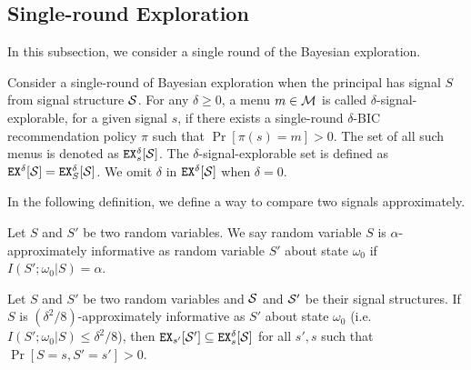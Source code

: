 \subsection{Single-round Exploration}
\label{sec:private_single}

In this subsection, we consider a single round of the Bayesian exploration.

\begin{definition}
Consider a single-round of Bayesian exploration when the principal has signal $S$ from signal structure $\S$. For any $\delta \geq 0$, a menu $m \in \M$ is called $\delta$-signal-explorable, for a given signal $s$, if there exists a single-round $\delta$-BIC recommendation policy $\pi$ such that $\Pr[\pi(s) = m] > 0$. The set of all such menus is denoted as $\EX^{\delta}_s[\S]$. The $\delta$-signal-explorable set is defined as $\EX^{\delta}[\S] = \EX^{\delta}_S[\S]$. We omit $\delta$ in $\EX^{\delta}[\S]$ when $\delta = 0$.
\end{definition}

In the following definition, we define a way to compare two signals approximately.
\begin{definition}
Let $S$ and $S'$ be two random variables. We say random variable $S$ is $\alpha$-approximately informative as random variable $S'$ about state $\omega_0$ if $I(S' ; \omega_0|S) = \alpha$.
\end{definition}

\begin{lemma}
\label{lem:ainfomono}
Let $S$ and $S'$ be two random variables and $\S$ and $\S'$ be their signal structures. If $S$ is $(\delta^2/8)$-approximately informative as $S'$ about state $\omega_0$ (i.e. $I(S' ; \omega_0|S) \leq \delta^2/8$), then $\EX_{s'}[\S'] \subseteq \EX^{\delta}_s[\S]$  for all $s' ,s$ such that $\Pr[S= s, S'= s'] > 0$.
\end{lemma}

